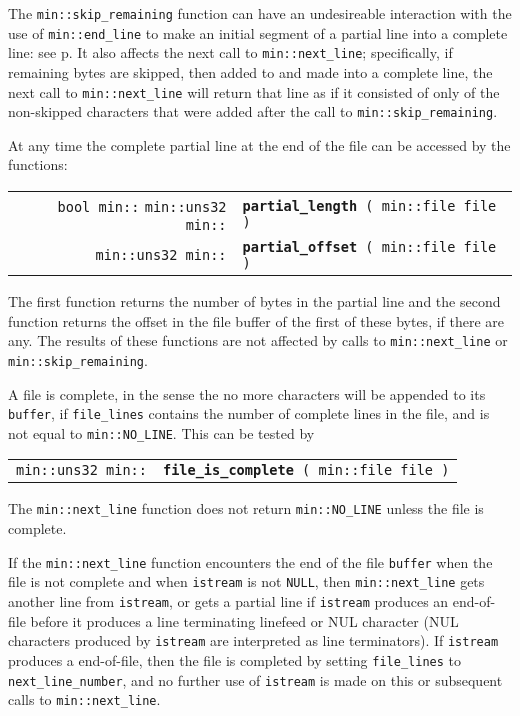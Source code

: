 \documentclass[12pt]{article}
\makeatletter
\newcommand{\ttindex}[1]{\index{#1@{\tt #1}}}
\newcommand{\minindex}[1]{\ttindex{min::#1}\ttindex{#1}}
\newcommand{\pagref}[1]{p\pageref{#1}}
\newcommand{\EOL}{\penalty \exhyphenpenalty}
\newenvironment{indpar}[1][0.3in]%
	{\begin{list}{}%
		     {\setlength{\itemsep}{0in}%
		      \setlength{\topsep}{0in}%
		      \setlength{\parsep}{1ex}%
		      \setlength{\labelwidth}{#1}%
		      \setlength{\leftmargin}{#1}%
		      \addtolength{\leftmargin}{\labelsep}}%
	 \item}%
	{\end{list}}
\newcommand{\LABEL}[1]{\label{#1}}
\newcommand{\MINKEY}[1]{{\tt \bf #1}\minindex{#1}}
\makeatother
\begin{document}
The {\tt min::skip\_remaining} function can have an undesireable
interaction with the use of {\tt min::\EOL end\_\EOL line} to
make an initial segment of a partial line into a complete line:
see \pagref{SKIP_REMAINING_END_LINE}.  It also affects the next
call to {\tt min::\EOL next\_\EOL line}; specifically, if remaining
bytes are skipped, then added to and made into a complete line,
the next call to {\tt min::\EOL next\_\EOL line} will return that line as if
it consisted of only of the non-skipped characters that were added
after the call to {\tt min::\EOL skip\_\EOL remaining}.

At any time the complete partial line at the end of the file can be
accessed by the functions:

\begin{indpar}[1em]\begin{tabular}{r@{}l}
\verb|bool min::|
\verb|min::uns32 min::|
    & \MINKEY{partial\_\EOL length}\verb| ( min::file file )|
\LABEL{MIN::PARTIAL_LENGTH} \\
\verb|min::uns32 min::|
    & \MINKEY{partial\_\EOL offset}\verb| ( min::file file )|
\LABEL{MIN::PARTIAL_OFFSET} \\
\end{tabular}\end{indpar}

The first function
returns the number of bytes in the partial line and the second
function returns the offset in the file buffer of the first of these
bytes, if there are any.  The results of these functions are not
affected by calls to {\tt min::\EOL next\_\EOL line} or
{\tt min::\EOL skip\_\EOL remaining}.

A file is complete, in the sense the no more characters will be
appended to its {\tt buffer}, if {\tt file\_\EOL lines} contains
the number of complete lines in the file, and is not equal to
{\tt min::\EOL NO\_\EOL LINE}.  This can be tested by

\begin{indpar}[1em]\begin{tabular}{r@{}l}
\verb|min::uns32 min::|
    & \MINKEY{file\_\EOL is\_\EOL complete}\verb| ( min::file file )|
\LABEL{MIN::FILE_IS_COMPLETE} \\
\end{tabular}\end{indpar}

The {\tt min::\EOL next\_\EOL line} function does not return
{\tt min::\EOL NO\_\EOL LINE} unless the file is complete.

If the {\tt min::\EOL next\_\EOL line} function encounters the
end of the file {\tt buffer} when the file is not complete
and when {\tt istream} is not {\tt NULL},
then {\tt min::\EOL next\_\EOL line} gets another line from
{\tt istream}, or gets a partial line if {\tt istream} produces
an end-of-file before it produces a line terminating linefeed
or NUL character (NUL characters produced by {\tt istream}
are interpreted as line terminators).  If {\tt istream} produces
a end-of-file, then the file is completed by setting
{\tt file\_\EOL lines} to {\tt next\_\EOL line\_\EOL number},
and no further use of {\tt istream} is made on this or subsequent calls to
{\tt min::\EOL next\_\EOL line}.
\end{document}
